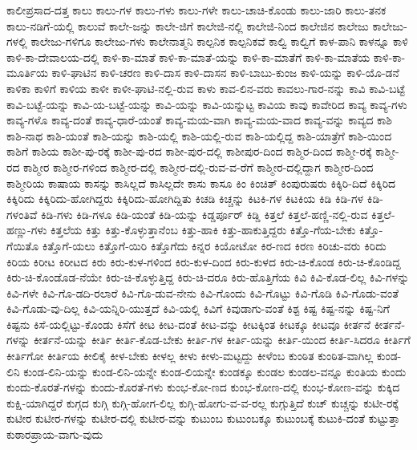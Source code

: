 {ಕಾಲೀಪ್ರಸಾದ-ದತ್ತ
ಕಾಲು
ಕಾಲು-ಗಳ
ಕಾಲು-ಗಳು
ಕಾಲು-ಗಳೇ
ಕಾಲು-ಚಾಚಿ-ಕೊಂಡು
ಕಾಲು-ಜಾರಿ
ಕಾಲು-ತನಕ
ಕಾಲು-ನಡಿಗೆ-ಯಲ್ಲಿ
ಕಾಲುವೆ
ಕಾಲೇ-ಜನ್ನು
ಕಾಲೇ-ಜಿಗೆ
ಕಾಲೇಜಿ-ನಲ್ಲಿ
ಕಾಲೇಜಿ-ನಿಂದ
ಕಾಲೇಜಿನ
ಕಾಲೇಜು
ಕಾಲೇಜು-ಗಳಲ್ಲಿ
ಕಾಲೇಜು-ಗಳಿಗೂ
ಕಾಲೇಜು-ಗಳು
ಕಾಲೇನಾತ್ಮನಿ
ಕಾಲ್ಪನಿಕ
ಕಾಲ್ಪನಿಕವೆ
ಕಾಲ್ವಿ
ಕಾಲ್ವಿಗೆ
ಕಾಳ-ಪಾನಿ
ಕಾಳನ್ನೂ
ಕಾಳಿ
ಕಾಳಿ-ಕಾ-ದೇವಾಲಯ-ದಲ್ಲಿ
ಕಾಳಿ-ಕಾ-ಮಾತೆ
ಕಾಳಿ-ಕಾ-ಮಾತೆ-ಯನ್ನು
ಕಾಳಿ-ಕಾ-ಮಾತೆಗೆ
ಕಾಳಿ-ಕಾ-ಮಾತೆಯ
ಕಾಳಿ-ಕಾ-ಮೂರ್ತಿಯ
ಕಾಳಿ-ಘಾಟಿನ
ಕಾಳಿ-ಚರಣ
ಕಾಳಿ-ದಾಸ
ಕಾಳಿ-ದಾಸನ
ಕಾಳಿ-ಬಾಬು-ಕುಂಜ
ಕಾಳಿ-ಯನ್ನು
ಕಾಳಿ-ಯೊ-ಡನೆ
ಕಾಳಿಕಾ
ಕಾಳಿಗೆ
ಕಾಳಿಯ
ಕಾಳೀ
ಕಾಳೀ-ಘಾಟಿ-ನಲ್ಲಿ-ರುವ
ಕಾಳು
ಕಾವ-ಲಿನ-ವರು
ಕಾವಲು-ಗಾರ-ನನ್ನು
ಕಾವಿ
ಕಾವಿ-ಬಟ್ಟೆ
ಕಾವಿ-ಬಟ್ಟೆ-ಯನ್ನು
ಕಾವಿ-ಯ-ಬಟ್ಟೆ-ಯನ್ನು
ಕಾವಿ-ಯನ್ನು
ಕಾವಿ-ಯನ್ನುಟ್ಟ
ಕಾವಿಯ
ಕಾವು
ಕಾವೇರಿದ
ಕಾವ್ಯ
ಕಾವ್ಯ-ಗಳು
ಕಾವ್ಯ-ಗಳೊ
ಕಾವ್ಯ-ದಂತೆ
ಕಾವ್ಯ-ಧಾರೆ-ಯಂತೆ
ಕಾವ್ಯ-ಮಯ-ವಾಗಿ
ಕಾವ್ಯ-ಮಯ-ವಾದ
ಕಾವ್ಯ-ವನ್ನು
ಕಾವ್ಯದ
ಕಾಶಿ
ಕಾಶಿ-ನಾಥ
ಕಾಶಿ-ಯಂತೆ
ಕಾಶಿ-ಯನ್ನು
ಕಾಶಿ-ಯಲ್ಲಿ
ಕಾಶಿ-ಯಲ್ಲಿ-ರುವ
ಕಾಶಿ-ಯಲ್ಲಿದ್ದ
ಕಾಶಿ-ಯಾತ್ರೆಗೆ
ಕಾಶಿ-ಯಿಂದ
ಕಾಶಿಗೆ
ಕಾಶಿಯ
ಕಾಶೀ-ಪು-ರಕ್ಕೆ
ಕಾಶೀ-ಪು-ರದ
ಕಾಶೀ-ಪುರ-ದಲ್ಲಿ
ಕಾಶೀಪುರ-ದಿಂದ
ಕಾಶ್ಮಿರ-ದಿಂದ
ಕಾಶ್ಮೀ-ರಕ್ಕೆ
ಕಾಶ್ಮೀ-ರದ
ಕಾಶ್ಮೀರ
ಕಾಶ್ಮೀರ-ಗಳಿಂದ
ಕಾಶ್ಮೀರ-ದಲ್ಲಿ
ಕಾಶ್ಮೀರ-ದಲ್ಲಿ-ರುವ-ವ-ರೆಗೆ
ಕಾಶ್ಮೀರ-ದಲ್ಲಿದ್ದಾಗ
ಕಾಶ್ಮೀರ-ದಿಂದ
ಕಾಶ್ಮೀರಿಯ
ಕಾಷಾಯ
ಕಾಸನ್ನು
ಕಾಸಿಲ್ಲದೆ
ಕಾಸಿಲ್ಲದೇ
ಕಾಸು
ಕಾಸೂ
ಕಿಂ
ಕಿಂಚಿತ್
ಕಿಂಪುರುಷರು
ಕಿಕ್ಕಿರಿ-ದಿದೆ
ಕಿಕ್ಕಿರಿದ
ಕಿಕ್ಕಿರಿದು
ಕಿಕ್ಕಿರಿದು-ಹೋಗಿದ್ದರು
ಕಿಕ್ಕಿರಿದು-ಹೋಗಿದ್ದಿತು
ಕಿಚಡಿ
ಕಿಚ್ಚನ್ನು
ಕಿಟಕಿ-ಗಳ
ಕಿಟಕಿಯ
ಕಿಡಿ
ಕಿಡಿ-ಗಳ
ಕಿಡಿ-ಗಳಂತಿವೆ
ಕಿಡಿ-ಗಳು
ಕಿಡಿ-ಗಳೂ
ಕಿಡಿ-ಯಂತೆ
ಕಿಡಿ-ಯನ್ನು
ಕಿಡ್ಡರ್ಪೂರ್
ಕಿಡ್ಡಿ
ಕಿತ್ತಲೆ
ಕಿತ್ತಲೆ-ಹಣ್ಣಿ-ನಲ್ಲಿ-ರುವ
ಕಿತ್ತಲೆ-ಹಣ್ಣು-ಗಳು
ಕಿತ್ತಲೆಯ
ಕಿತ್ತು
ಕಿತ್ತು-ಕೊಳ್ಳುತ್ತಾನೆಂಬ
ಕಿತ್ತು-ಹಾಕಿ
ಕಿತ್ತು-ಹಾಕುತ್ತಿದ್ದರು
ಕಿತ್ತೊ-ಗೆಯ-ಬೇಕು
ಕಿತ್ತೊ-ಗೆಯಿತೊ
ಕಿತ್ತೊಗೆ-ಯಲು
ಕಿತ್ತೊಗೆ-ಯಿರಿ
ಕಿತ್ತೊಗೆದು
ಕಿನ್ನರ
ಕಿಯೋಟೋ
ಕಿರ-ಣದ
ಕಿರಣ
ಕಿರಿಚು-ವರು
ಕಿರಿದು
ಕಿರಿಯ
ಕಿರೀಟ
ಕಿರೀಟದ
ಕಿರು
ಕಿರು-ಕುಳ-ಗಳಿಂದ
ಕಿರು-ಕುಳ-ದಿಂದ
ಕಿರು-ಕುಳದ
ಕಿರು-ಚಿ-ಕೊಂಡ
ಕಿರು-ಚಿ-ಕೊಂಡಿದ್ದ
ಕಿರು-ಚಿ-ಕೊಂಡೊಡ-ನೆಯೇ
ಕಿರು-ಚಿ-ಕೊಳ್ಳುತ್ತಿದ್ದ
ಕಿರು-ಚಿ-ದರೂ
ಕಿರು-ಹೊತ್ತಿಗೆಯ
ಕಿವಿ
ಕಿವಿ-ಕೊಡ-ಲಿಲ್ಲ
ಕಿವಿ-ಗಳನ್ನು
ಕಿವಿ-ಗಳೇ
ಕಿವಿ-ಗೊ-ಡದಿ-ರಲಾರೆ
ಕಿವಿ-ಗೊ-ಡುವ-ನೇನು
ಕಿವಿ-ಗೊಂದು
ಕಿವಿ-ಗೊಟ್ಟು
ಕಿವಿ-ಗೊಡಿ
ಕಿವಿ-ಗೊಡು-ವಂತೆ
ಕಿವಿ-ಗೊಡು-ವು-ದಿಲ್ಲ
ಕಿವಿ-ಯನ್ನಿರಿ-ಯುತ್ತದೆ
ಕಿವಿ-ಯಲ್ಲಿ
ಕಿವಿಗೆ
ಕಿವುಡಾಗು-ವಂತೆ
ಕಿಶ್ಟ
ಕಿಷ್ಟ
ಕಿಷ್ಟ-ನನ್ನು
ಕಿಷ್ಟ-ನಿಗೆ
ಕಿಷ್ಟನು
ಕಿಸೆ-ಯಲ್ಲಿಟ್ಟು-ಕೊಂಡು
ಕಿಸೆಗೆ
ಕೀಟ
ಕೀಟ-ದಂತೆ
ಕೀಟ-ವನ್ನು
ಕೀಟಕ್ಕಿಂತ
ಕೀಟಕ್ಕೂ
ಕೀಟವೂ
ಕೀರ್ತನೆ
ಕೀರ್ತನೆ-ಗಳನ್ನು
ಕೀರ್ತನೆ-ಯನ್ನು
ಕೀರ್ತಿ
ಕೀರ್ತಿ-ಕೊಡ-ಬೇಕು
ಕೀರ್ತಿ-ಗಳ
ಕೀರ್ತಿ-ಯನ್ನು
ಕೀರ್ತಿ-ಯಿಂದ
ಕೀರ್ತಿ-ಸಿದರೂ
ಕೀರ್ತಿಗೆ
ಕೀರ್ತಿಗೋ
ಕೀರ್ತಿಯ
ಕೀಲಿಕೈ
ಕೀಳ-ಬೇಕು
ಕೀಳಲ್ಲ
ಕೀಳು
ಕೀಳು-ಮಟ್ಟದ್ದು
ಕೀಳೆಂಬ
ಕುಂಠಿತ
ಕುಂಠಿತ-ವಾಗಿಲ್ಲ
ಕುಂಡ-ಲಿನಿ
ಕುಂಡ-ಲಿನಿ-ಯನ್ನು
ಕುಂಡ-ಲಿನಿ-ಯನ್ನೇ
ಕುಂಡ-ಲಿಯನ್ನೇ
ಕುಂಡಕ್ಕೂ
ಕುಂಡಲ
ಕುಂಡಲ-ವನ್ನೂ
ಕುಂತಿಯ
ಕುಂದು
ಕುಂದು-ಕೊರತೆ-ಗಳನ್ನು
ಕುಂದು-ಕೊರತೆ-ಗಳು
ಕುಂಭ-ಕೋ-ಣದ
ಕುಂಭ-ಕೋಣ-ದಲ್ಲಿ
ಕುಂಭ-ಕೋಣ-ವನ್ನು
ಕುಕ್ಕಿದ
ಕುಕ್ಷಿ-ಯಾಗಿದ್ದರೆ
ಕುಗ್ಗದ
ಕುಗ್ಗಿ
ಕುಗ್ಗಿ-ಹೋಗ-ಲಿಲ್ಲ
ಕುಗ್ಗಿ-ಹೋಗು-ವ-ವ-ರಲ್ಲ
ಕುಗ್ಗುತ್ತಿದೆ
ಕುಚ್
ಕುಚ್ಚನ್ನು
ಕುಟೀ-ರಕ್ಕೆ
ಕುಟೀರ
ಕುಟೀರ-ಗಳನ್ನು
ಕುಟೀರ-ದಲ್ಲಿ
ಕುಟೀರ-ವನ್ನು
ಕುಟುಂಬ
ಕುಟುಂಬಕ್ಕೂ
ಕುಟುಂಬಕ್ಕೆ
ಕುಟುಕಿ-ದಂತೆ
ಕುಟ್ಟುತ್ತಾ
ಕುಠಾರಪ್ರಾಯ-ವಾಗು-ವುದು
}
